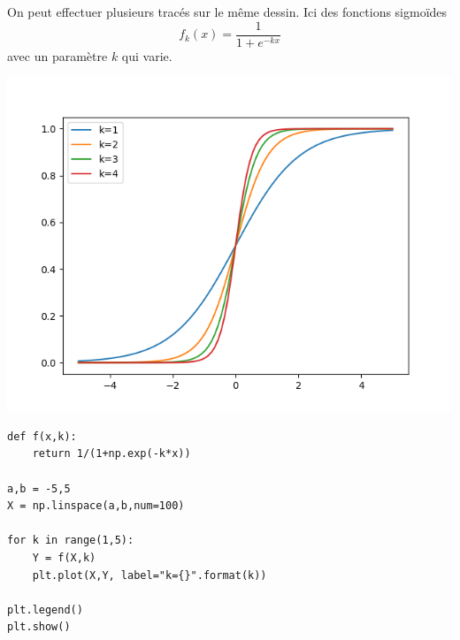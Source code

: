 \documentclass[11pt,class=report,crop=false]{standalone}
\begin{document}
\begin{minipage}{0.4\textwidth}
On peut effectuer plusieurs tracés sur le même dessin. Ici des fonctions sigmoïdes
$$f_k(x) = \frac{1}{1+e^{-kx}}$$
avec un paramètre $k$ qui varie.
\end{minipage}
\begin{minipage}{0.59\textwidth}
\begin{center}
\includegraphics[scale=\myscale,scale=0.5]{figures/pythonx-sigma}
\end{center}
\end{minipage}


\begin{lstlisting}
def f(x,k):
	return 1/(1+np.exp(-k*x))

a,b = -5,5
X = np.linspace(a,b,num=100)

for k in range(1,5):
	Y = f(X,k)
	plt.plot(X,Y, label="k={}".format(k))

plt.legend()
plt.show()
\end{lstlisting}
\end{document}
